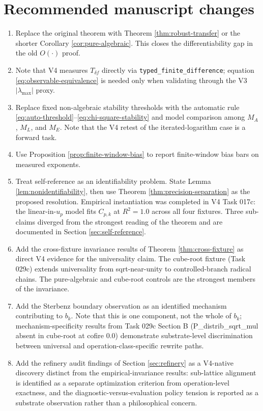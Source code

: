\documentclass[11pt,a4paper]{article}
\begin{document}
\section{Recommended manuscript changes}

\begin{enumerate}
    \item Replace the original theorem with Theorem \ref{thm:robust-transfer} or the shorter Corollary \ref{cor:pure-algebraic}. This closes the differentiability gap in the old $O(\cdot)$ proof.
    \item Note that V4 measures $T_{\delta f}$ directly via \texttt{typed\_finite\_difference}; equation \eqref{eq:observable-equivalence} is needed only when validating through the V3 $|\lambda_{\max}|$ proxy.
    \item Replace fixed non-algebraic stability thresholds with the automatic rule \eqref{eq:auto-threshold}--\eqref{eq:chi-square-stability} and model comparison among $M_A$, $M_L$, and $M_E$. Note that the V4 retest of the iterated-logarithm case is a forward task.
    \item Use Proposition \ref{prop:finite-window-bias} to report finite-window bias bars on measured exponents.
    \item Treat self-reference as an identifiability problem. State Lemma \ref{lem:nonidentifiability}, then use Theorem \ref{thm:precision-separation} as the proposed resolution. Empirical instantiation was completed in V4 Task 017c: the linear-in-$u_p$ model fits $C_{p,k}$ at $R^2 = 1.0$ across all four fixtures. Three sub-claims diverged from the strongest reading of the theorem and are documented in Section \ref{sec:self-reference}.
    \item Add the cross-fixture invariance results of Theorem \ref{thm:cross-fixture} as direct V4 evidence for the universality claim. The cube-root fixture (Task 029c) extends universality from sqrt-near-unity to controlled-branch radical chains. The pure-algebraic and cube-root controls are the strongest members of the invariance.
    \item Add the Sterbenz boundary observation as an identified mechanism contributing to $b_k$. Note that this is one component, not the whole of $b_k$; mechanism-specificity results from Task 029c Section B (P\_distrib\_sqrt\_mul absent in cube-root at cofire 0.0) demonstrate substrate-level discrimination between universal and operation-class-specific rewrite paths.
    \item Add the refinery audit findings of Section \ref{sec:refinery} as a V4-native discovery distinct from the empirical-invariance results: sub-lattice alignment is identified as a separate optimization criterion from operation-level exactness, and the diagnostic-versus-evaluation policy tension is reported as a substrate observation rather than a philosophical concern.

\end{enumerate}
\end{document}
